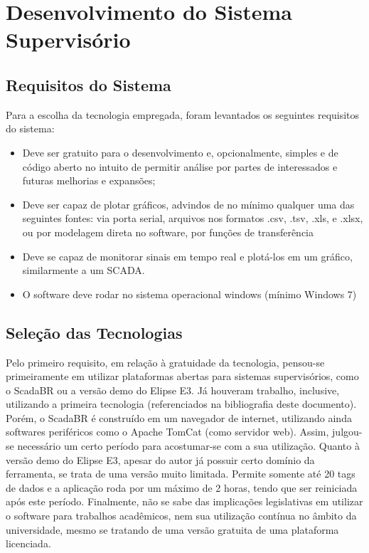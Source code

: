 \chapter{Desenvolvimento do Sistema Supervisório}

\section{Requisitos do Sistema}

Para a escolha da tecnologia empregada, foram levantados os seguintes requisitos do sistema:
\begin{itemize}
	\item Deve ser gratuito para o desenvolvimento e, opcionalmente, simples e de código aberto no intuito de permitir análise por partes de interessados e futuras melhorias e expansões;
	\item Deve ser capaz de plotar gráficos, advindos de no mínimo qualquer uma das seguintes fontes: via porta serial, arquivos nos formatos .csv, .tsv, .xls, e .xlsx, ou por modelagem direta no software, por funções de transferência
	\item Deve se capaz de monitorar sinais em tempo real e plotá-los em um gráfico, similarmente a um SCADA.
	\item O software deve rodar no sistema operacional windows (mínimo Windows 7)
\end{itemize}

\section{Seleção das Tecnologias}

Pelo primeiro requisito, em relação à gratuidade da tecnologia, pensou-se primeiramente em utilizar plataformas abertas para sistemas supervisórios, como o ScadaBR ou a versão demo do Elipse E3. Já houveram trabalho, inclusive, utilizando a primeira tecnologia (referenciados na bibliografia deste documento). Porém, o ScadaBR é construído em um navegador de internet, utilizando ainda softwares periféricos como o Apache TomCat (como servidor web). Assim, julgou-se necessário um certo período para acostumar-se com a sua utilização. Quanto à versão demo do Elipse E3, apesar do autor já possuir certo domínio da ferramenta, se trata de uma versão muito limitada. Permite somente até 20 tags de dados e a aplicação roda por um máximo de 2 horas, tendo que ser reiniciada após este período. Finalmente, não se sabe das implicações legislativas em utilizar o software para trabalhos acadêmicos, nem sua utilização contínua no âmbito da universidade, mesmo se tratando de uma versão gratuita de uma plataforma licenciada.

